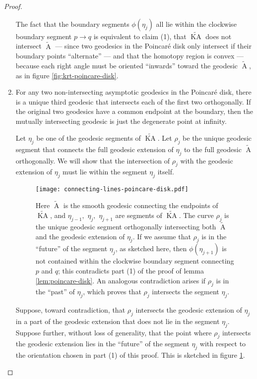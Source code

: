\documentclass[a4paper,11pt]{article}
\renewcommand{\tilde}{\widetilde}
\newcommand{\KA}{\operatorname{KA}}
\newcommand{\A}{\operatorname{A}}
\begin{document}
\begin{proof}
\begin{enumerate}[(1)]
        The fact that the boundary segments $\phi(\eta_j)$ all lie within the clockwise boundary segment $p \rightarrow q$ is equivalent to claim (1), that $\tilde{\KA}$ does not intersect $\tilde{\A}$ --- since two geodesics in the Poincar\'{e} disk only intersect if their boundary points ``alternate'' --- and that the homotopy region is convex --- because each right angle must be oriented ``inwards'' toward the geodesic $\tilde{\A}$, as in figure \ref{fig:krt-poincare-disk}.
        
        \item 
        For any two non-intersecting asymptotic geodesics in the Poincar\'{e} disk, there is a unique third geodesic that intersects each of the first two orthogonally. If the original two geodesics have a common endpoint at the boundary, then the mutually intersecting geodesic is just the degenerate point at infinity.
        
        Let $\eta_{j}$ be one of the geodesic segments of $\tilde{\KA}$. Let $\rho_j$ be the unique geodesic segment that connects the full geodesic extension of $\eta_j$ to the full geodesic $\tilde{\A}$ orthogonally. We will show that the intersection of $\rho_j$ with the geodesic extension of $\eta_j$ must lie within the segment $\eta_j$ itself.
        
        \begin{figure}
        \centering
            \texttt{[image: connecting-lines-poincare-disk.pdf]}
            \caption{Here $\tilde{\A}$ is the smooth geodesic connecting the endpoints of $\tilde{\KA}$, and $\eta_{j-1},$ $\eta_{j},$ $\eta_{j+1}$ are segments of $\tilde{\KA}.$ The curve $\rho_j$ is the unique geodesic segment orthogonally intersecting both $\tilde{\A}$ and the geodesic extension of $\eta_j$. If we assume that $\rho_j$ is in the ``future'' of the segment $\eta_j$, as sketched here, then $\phi(\eta_{j+1})$ is not contained within the clockwise boundary segment connecting $p$ and $q$; this contradicts part (1) of the proof of lemma \ref{lem:poincare-disk}. An analogous contradiction arises if $\rho_j$ is in the ``past'' of $\eta_j$, which proves that $\rho_j$ intersects the segment $\eta_j$.}
            \label{fig:connecting-lines-poincare-disk}
        \end{figure}
        
        Suppose, toward contradiction, that $\rho_j$ intersects the geodesic extension of $\eta_j$ in a part of the geodesic extension that does not lie in the segment $\eta_j$. Suppose further, without loss of generality, that the point where $\rho_j$ intersects the geodesic extension lies in the ``future'' of the segment $\eta_j$ with respect to the orientation chosen in part (1) of this proof. This is sketched in figure \ref{fig:connecting-lines-poincare-disk}.
        

\end{enumerate}
\end{proof}
\end{document}
